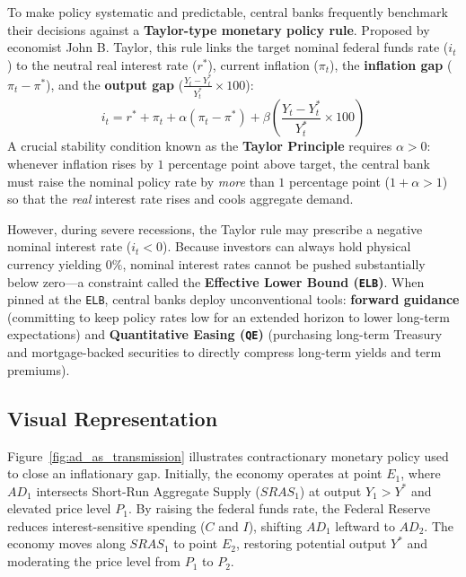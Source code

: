 \documentclass[11pt, a4paper]{article}
\begin{document}
To make policy systematic and predictable, central banks frequently benchmark their decisions against a \textbf{Taylor-type monetary policy rule}. Proposed by economist John B. Taylor, this rule links the target nominal federal funds rate ($i_t$) to the neutral real interest rate ($r^*$), current inflation ($\pi_t$), the \textbf{inflation gap} ($\pi_t - \pi^*$), and the \textbf{output gap} ($\frac{Y_t - Y_t^*}{Y_t^*} \times 100$):
\begin{equation}
  i_t = r^* + \pi_t + \alpha(\pi_t - \pi^*) + \beta\left(\frac{Y_t - Y_t^*}{Y_t^*} \times 100\right)
  \label{eq:taylor_rule}
\end{equation}
A crucial stability condition known as the \textbf{Taylor Principle} requires $\alpha > 0$: whenever inflation rises by $1$ percentage point above target, the central bank must raise the nominal policy rate by \emph{more} than $1$ percentage point ($1 + \alpha > 1$) so that the \emph{real} interest rate rises and cools aggregate demand.

However, during severe recessions, the Taylor rule may prescribe a negative nominal interest rate ($i_t < 0$). Because investors can always hold physical currency yielding $0\%$, nominal interest rates cannot be pushed substantially below zero---a constraint called the \textbf{Effective Lower Bound (\texttt{ELB})}. When pinned at the \texttt{ELB}, central banks deploy unconventional tools: \textbf{forward guidance} (committing to keep policy rates low for an extended horizon to lower long-term expectations) and \textbf{Quantitative Easing (\texttt{QE})} (purchasing long-term Treasury and mortgage-backed securities to directly compress long-term yields and term premiums).

\subsection*{Visual Representation}
Figure~\ref{fig:ad_as_transmission} illustrates contractionary monetary policy used to close an inflationary gap. Initially, the economy operates at point $E_1$, where $AD_1$ intersects Short-Run Aggregate Supply ($SRAS_1$) at output $Y_1 > Y^*$ and elevated price level $P_1$. By raising the federal funds rate, the Federal Reserve reduces interest-sensitive spending ($C$ and $I$), shifting $AD_1$ leftward to $AD_2$. The economy moves along $SRAS_1$ to point $E_2$, restoring potential output $Y^*$ and moderating the price level from $P_1$ to $P_2$.
\end{document}
